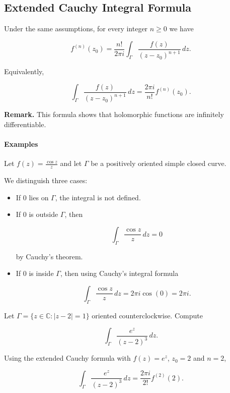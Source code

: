 
\subsection{Extended Cauchy Integral Formula}
Under the same assumptions, for every integer $n \ge 0$ we have

\begin{corollary}
\[
f^{(n)}(z_0)
=
\frac{n!}{2\pi i}
\int_\Gamma
\frac{f(z)}{(z-z_0)^{n+1}}\,dz .
\]
\end{corollary}
Equivalently,

\[
\int_\Gamma
\frac{f(z)}{(z-z_0)^{n+1}}\,dz
=
\frac{2\pi i}{n!}f^{(n)}(z_0).
\]

\textbf{Remark.}  
This formula shows that holomorphic functions are infinitely differentiable.

\paragraph{Examples}
Let $f(z) = \frac{\cos z}{z}$
and let $\Gamma$ be a positively oriented simple closed curve.

We distinguish three cases:

\begin{itemize}

\item If $0$ lies on $\Gamma$, the integral is not defined.

\item If $0$ is outside $\Gamma$, then

\[
\int_\Gamma \frac{\cos z}{z}\,dz = 0
\]

by Cauchy's theorem.

\item If $0$ is inside $\Gamma$, then using Cauchy's integral formula

\[
\int_\Gamma \frac{\cos z}{z}\,dz
=
2\pi i \cos(0)
=
2\pi i .
\]

\end{itemize}

Let $\Gamma = \{z \in \mathbb{C} : |z-2| = 1\}$ oriented counterclockwise.  
Compute

\[
\int_\Gamma \frac{e^z}{(z-2)^3}\,dz .
\]

Using the extended Cauchy formula with $f(z)=e^z$, $z_0=2$ and $n=2$,

\[
\int_\Gamma \frac{e^z}{(z-2)^3}\,dz
=
\frac{2\pi i}{2!} f^{(2)}(2).
\]

